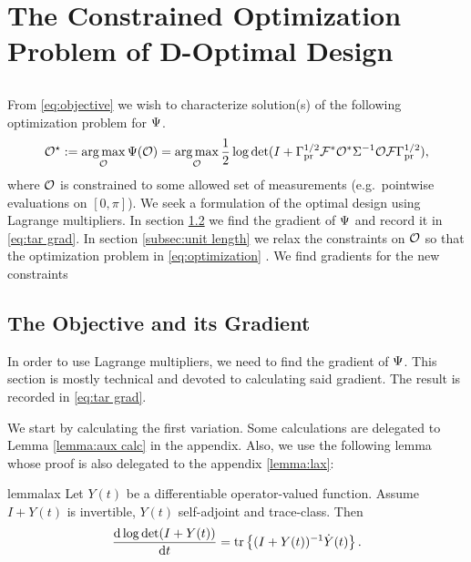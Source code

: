 \documentclass{amsart}
\numberwithin{equation}{section}
\begin{document}
\section{The Constrained Optimization Problem of D-Optimal Design}\label{section:D and grad}

\subsection{}
From \eqref{eq:objective} we wish to characterize solution(s) of the
following optimization problem for $\Psi$. %
\begin{align}\label{eq:optimization}
  \mathcal{O}^{\star} := \operatorname*{arg\,max}_{\mathcal{O}} \Psi( \mathcal{O} ) 
  = \operatorname*{arg\,max}_{\mathcal{O}} \frac12 \log \det 
  (I + \Gamma_{\textup{pr}}^{1/2} \mathcal{F}^*\mathcal{O}^* \Sigma^{-1} \mathcal{O} \mathcal{F} \Gamma_{\textup{pr}}^{1/2}),
\end{align}
where $\mathcal{O}$ is constrained to some allowed set of measurements
(e.g.\ pointwise evaluations on $[0,\pi]$).
We seek a formulation of the optimal design using Lagrange
multipliers. In section \ref{section:objective} we find the gradient
of $\Psi$ and record it in \eqref{eq:tar grad}. In section
\ref{subsec:unit length} we relax the constraints on $\mathcal{O}$ so that
the optimization problem in \eqref{eq:optimization} .  We find gradients for the new constraints

\subsection{The Objective and its Gradient}\label{section:objective}
In order to use Lagrange multipliers, we need to find the gradient of
$\Psi$. This section is mostly technical and devoted to calculating
said gradient. The result is recorded in \eqref{eq:tar grad}.

We start by calculating the first variation. Some calculations are
delegated to Lemma \ref{lemma:aux calc} in the appendix. Also, we use
the following lemma whose proof is also delegated to the appendix
\ref{lemma:lax}:
\begin{restatable*}{lemma}{lax}\label{lemma:lax}
  Let $Y(t)$ be a differentiable operator-valued function. Assume 
  $I+Y(t)$ is invertible, $Y(t)$ self-adjoint and trace-class. Then
  \begin{equation*}
    \frac{\text{\textup{d}} \log \det (I+Y(t))}{\text{\textup{d}} t} = \textup{tr}\left \{(I+Y(t))^{-1} \dot{Y}(t) \right \}.
  \end{equation*}
\end{restatable*}
\end{document}
